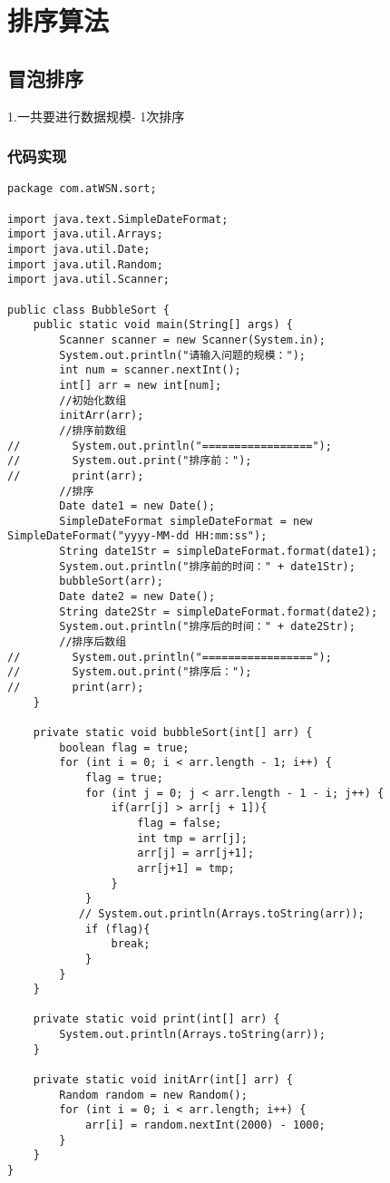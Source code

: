 \documentclass[a4paper]{report}
\begin{document}
\chapter{排序算法}
\section{冒泡排序}
1.一共要进行数据规模- 1次排序
\subsection{代码实现}

\begin{lstlisting}
package com.atWSN.sort;

import java.text.SimpleDateFormat;
import java.util.Arrays;
import java.util.Date;
import java.util.Random;
import java.util.Scanner;

public class BubbleSort {
    public static void main(String[] args) {
        Scanner scanner = new Scanner(System.in);
        System.out.println("请输入问题的规模：");
        int num = scanner.nextInt();
        int[] arr = new int[num];
        //初始化数组
        initArr(arr);
        //排序前数组
//        System.out.println("=================");
//        System.out.print("排序前：");
//        print(arr);
        //排序
        Date date1 = new Date();
        SimpleDateFormat simpleDateFormat = new SimpleDateFormat("yyyy-MM-dd HH:mm:ss");
        String date1Str = simpleDateFormat.format(date1);
        System.out.println("排序前的时间：" + date1Str);
        bubbleSort(arr);
        Date date2 = new Date();
        String date2Str = simpleDateFormat.format(date2);
        System.out.println("排序后的时间：" + date2Str);
        //排序后数组
//        System.out.println("=================");
//        System.out.print("排序后：");
//        print(arr);
    }

    private static void bubbleSort(int[] arr) {
        boolean flag = true;
        for (int i = 0; i < arr.length - 1; i++) {
            flag = true;
            for (int j = 0; j < arr.length - 1 - i; j++) {
                if(arr[j] > arr[j + 1]){
                    flag = false;
                    int tmp = arr[j];
                    arr[j] = arr[j+1];
                    arr[j+1] = tmp;
                }
            }
           // System.out.println(Arrays.toString(arr));
            if (flag){
                break;
            }
        }
    }

    private static void print(int[] arr) {
        System.out.println(Arrays.toString(arr));
    }

    private static void initArr(int[] arr) {
        Random random = new Random();
        for (int i = 0; i < arr.length; i++) {
            arr[i] = random.nextInt(2000) - 1000;
        }
    }
}
\end{lstlisting}
\end{document}

